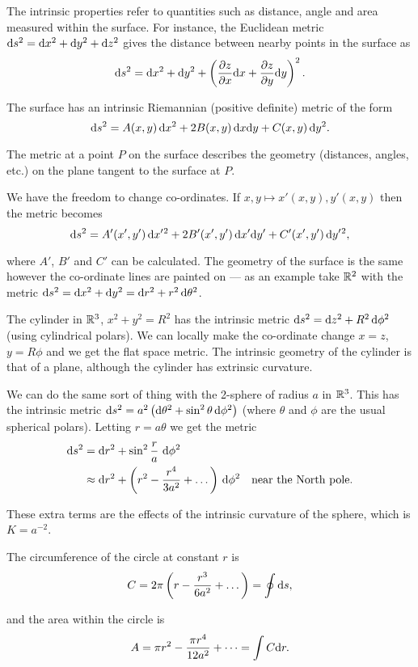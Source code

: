 \documentclass{notes}
\begin{document}
The intrinsic properties refer to quantities such as distance, angle
and area measured within the surface.  For instance, the
Euclidean metric $\mathrm{d} s^2 = \mathrm{d} x^2 + \mathrm{d} y^2 + \mathrm{d} z^2$ gives
the distance between nearby points in the surface as
\[
\mathrm{d} s^2 = \mathrm{d} x^2 + \mathrm{d} y^2 + \left( \frac{\partial z}{\partial x} \mathrm{d} x + \frac{\partial z}{\partial y} \mathrm{d} y
\right)^2.
\]

The surface has an intrinsic Riemannian (positive definite) metric of the form
\[
\mathrm{d} s^2 = A(x,y)\, \mathrm{d} x^2 + 2 B(x,y)\, \mathrm{d} x \mathrm{d} y + C(x,y)\, \mathrm{d} y^2.
\]

The metric at a point $P$ on the surface describes the geometry (distances,
angles, etc.) on the plane tangent to the surface at $P$.

We have the freedom to change co-ordinates.  If $x,y \mapsto
x'(x,y), y'(x,y)$ then the metric becomes
\[
\mathrm{d} s^2 = A'(x',y')\, \mathrm{d} x'{}^2 + 2 B'(x',y')\, \mathrm{d} x' \mathrm{d} y' + C'(x',y')\,
\mathrm{d} y'{}^2,
\]

where $A'$, $B'$ and $C'$ can be calculated.  The geometry of the
surface is the same however the co-ordinate lines are painted on ---
as an example take $\mathbb{R}^2$ with the metric ${\mathrm{d} s^2 = \mathrm{d} x^2 + \mathrm{d} y^2
= \mathrm{d} r^2 + r^2\, \mathrm{d} \theta^2}$.

The cylinder in $\mathbb{R}^3$, $x^2 + y^2 = R^2$ has the intrinsic
metric $\mathrm{d} s^2 = \mathrm{d} z^2 + R^2\, \mathrm{d} \phi^2$ (using cylindrical polars).
We can locally make the co-ordinate change $x = z$, $y = R \phi$ and
we get the flat space metric.  The intrinsic geometry of the cylinder is
that of a plane, although the cylinder has extrinsic curvature.

We can do the same sort of thing with the 2-sphere of radius $a$ in
$\mathbb{R}^3$. This has the intrinsic metric $\mathrm{d} s^2 = a^2 \left( \mathrm{d}
  \theta^2 + \sin^2 \theta\, \mathrm{d} \phi^2 \right)$ (where $\theta$ and
$\phi$ are the usual spherical polars).  Letting $r = a \theta$ we get
the metric
\begin{align*}
\mathrm{d} s^2 &= \mathrm{d} r^2 + \sin^2 \frac{r}{a}\ \mathrm{d} \phi^2 \\
& \approx \mathrm{d} r^2 + \left( r^2 - \frac{r^4}{3 a^2} + \dots \right)\, \mathrm{d} \phi^2
\quad \text{near the North pole.}
\end{align*}

These extra terms are the effects of the intrinsic curvature of the sphere,
which is $K = a^{-2}$.

The circumference of the circle at constant $r$ is
\[
C = 2 \pi \left(r - \frac{r^3}{6 a^2} + \dots \right) = \oint \mathrm{d} s,
\]

and the area within the circle is
\[
A = \pi r^2 - \frac{\pi r^4}{12 a^2} + \dots = \int C \mathrm{d} r.
\]
\end{document}
